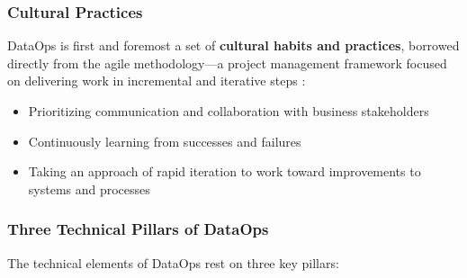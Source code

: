 \documentclass{article}
\begin{document}
\subsubsection{Cultural Practices}
DataOps is first and foremost a set of \textbf{cultural habits and practices}, borrowed directly from the agile methodology---a project management framework focused on delivering work in incremental and iterative steps \cite{beck2001agile}:
\begin{itemize}
    \item Prioritizing communication and collaboration with business stakeholders
    \item Continuously learning from successes and failures
    \item Taking an approach of rapid iteration to work toward improvements to systems and processes
\end{itemize}

\subsubsection{Three Technical Pillars of DataOps}
The technical elements of DataOps rest on three key pillars:
\end{document}
